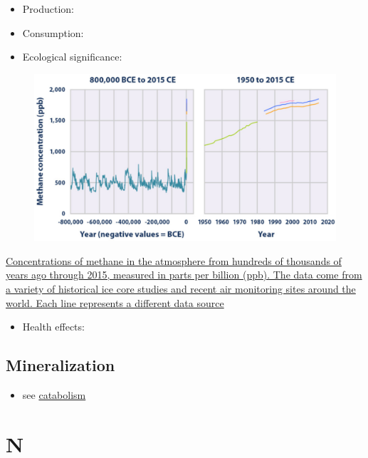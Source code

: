 \documentclass[]{book}
\providecommand{\tightlist}{%
  \setlength{\itemsep}{0pt}\setlength{\parskip}{0pt}}
\theoremstyle{definition}
\theoremstyle{definition}
\theoremstyle{definition}
\theoremstyle{remark}
\begin{document}
\begin{itemize}
\item
  Production:
\item
  Consumption:
\item
  Ecological significance:
\end{itemize}

\begin{figure}
\centering
\includegraphics{pictures/CH4_concentrations.png}
\caption{}
\end{figure}

\href{https://www.epa.gov/sites/production/files/2016-08/documents/print_ghg-concentrations-2016.pdf}{Concentrations
of methane in the atmosphere from hundreds of thousands of years ago
through 2015, measured in parts per billion (ppb). The data come from a
variety of historical ice core studies and recent air monitoring sites
around the world. Each line represents a different data
source}\citep{Epa2016-yj}

\begin{itemize}
\tightlist
\item
  Health effects:
\end{itemize}

\subsection{Mineralization}\label{mineralization}

\begin{itemize}
\tightlist
\item
  see \protect\hyperlink{catabolism}{catabolism}
\end{itemize}

\section{N}\label{n}
\end{document}
